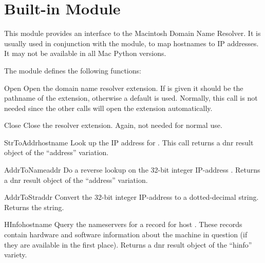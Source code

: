 \section{Built-in Module }
\label{module-macdnr}

This module provides an interface to the Macintosh Domain Name
Resolver.  It is usually used in conjunction with the 
module, to map hostnames to IP addresses.  It may not be available in
all Mac Python versions.

The  module defines the following functions:


\begin{funcdesc}{Open}{}
Open the domain name resolver extension.  If  is given it
should be the pathname of the extension, otherwise a default is
used.  Normally, this call is not needed since the other calls will
open the extension automatically.
\end{funcdesc}

\begin{funcdesc}{Close}{}
Close the resolver extension.  Again, not needed for normal use.
\end{funcdesc}

\begin{funcdesc}{StrToAddr}{hostname}
Look up the IP address for .  This call returns a dnr
result object of the ``address'' variation.
\end{funcdesc}

\begin{funcdesc}{AddrToName}{addr}
Do a reverse lookup on the 32-bit integer IP-address
.  Returns a dnr result object of the ``address'' variation.
\end{funcdesc}

\begin{funcdesc}{AddrToStr}{addr}
Convert the 32-bit integer IP-address  to a dotted-decimal
string.  Returns the string.
\end{funcdesc}

\begin{funcdesc}{HInfo}{hostname}
Query the nameservers for a  record for host
.  These records contain hardware and software
information about the machine in question (if they are available in
the first place).  Returns a dnr result object of the ``hinfo''
variety.
\end{funcdesc}

